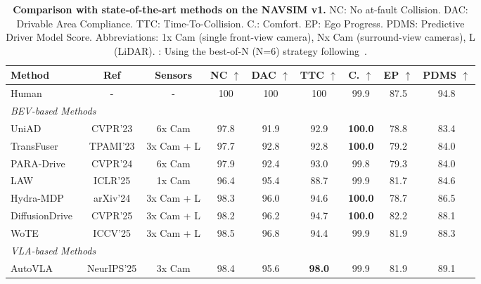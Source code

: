 \begin{table}[t] \small
\centering
\caption{\textbf{Comparison with state-of-the-art methods on the NAVSIM v1.} 
NC: No at-fault Collision.
DAC: Drivable Area Compliance.
TTC: Time-To-Collision.
C.: Comfort.
EP: Ego Progress.
PDMS: Predictive Driver Model Score.
Abbreviations: 1x Cam (single front-view camera), Nx Cam (surround-view cameras), L (LiDAR).
 \dag: Using the best-of-N (N=6) strategy following~\cite{autovla}.
 }
 \vspace{-5mm}
\label{tab:sota_navsim_v1}
\setlength{\tabcolsep}{10pt}
\begin{center}
        \begin{tabular}{l|c|c|cc|ccc|>{\columncolor{gray!25}}c}
            \toprule
            \textbf{Method} & \textbf{Ref} & \textbf{Sensors} & \textbf{NC $\uparrow$} & \textbf{DAC $\uparrow$} & \textbf{TTC $\uparrow$} & \textbf{C. $\uparrow$} & \textbf{EP $\uparrow$} & \textbf{PDMS $\uparrow$} \\ 
            \midrule
            Human & - & - & 100 & 100 & 100 & 99.9 & 87.5 & 94.8 \\ 
            \midrule
            \multicolumn{9}{l}{\textit{BEV-based Methods}} \\
            UniAD~\citep{uniad} & CVPR'23 & 6x Cam & 97.8 & 91.9 & 92.9 & \textbf{100.0} & 78.8 & 83.4 \\
            TransFuser~\citep{transfuser} & TPAMI'23 & 3x Cam + L & 97.7 & 92.8 & 92.8 & \textbf{100.0} & 79.2 & 84.0 \\  
            PARA-Drive~\citep{para-drive} & CVPR'24 & 6x Cam& 97.9 & 92.4 & 93.0 & 99.8 & 79.3 & 84.0 \\  
            LAW~\citep{law} & ICLR'25 & 1x Cam & 96.4 & 95.4 & 88.7 & 99.9 & 81.7 & 84.6 \\
            Hydra-MDP~\citep{hydra-mdp} & arXiv'24 & 3x Cam + L & 98.3 & 96.0 & 94.6 & \textbf{100.0} & 78.7 & 86.5 \\
            DiffusionDrive~\citep{diffusiondrive} & CVPR'25 & 3x Cam + L & 98.2 & 96.2 & 94.7 & \textbf{100.0} & 82.2 & 88.1 \\
            WoTE~\citep{wote} & ICCV'25 & 3x Cam + L & 98.5 & 96.8 & 94.4 & 99.9 & 81.9 & 88.3 \\
            \midrule
            \multicolumn{9}{l}{\textit{VLA-based Methods}} \\
            AutoVLA~\citep{autovla} & NeurIPS'25 & 3x Cam & 98.4 & 95.6 & \textbf{98.0} & 99.9 & 81.9 & 89.1 \\

\end{tabular}
\end{center}
\end{table}
